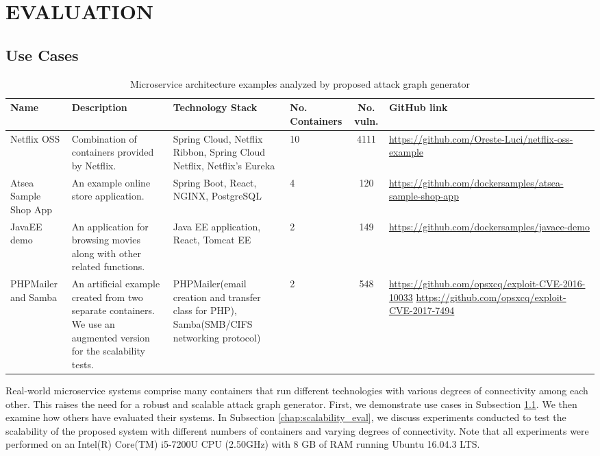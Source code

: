 
\section{EVALUATION}
\label{chap:eval}

\subsection{Use Cases}
\label{chap:heterogenious_systems}
\begin{table*}[!htb]
	\begin{center}
		\begin{tabular}{ p{20mm}p{35mm}p{35mm}p{10mm}cp{35mm} } 
			\hline
			Name & Description & Technology Stack & No. Containers & No. vuln. & GitHub link \\\hline 
			
			Netflix OSS & Combination of containers provided by Netflix. & Spring Cloud, Netflix Ribbon, Spring Cloud Netflix, Netflix's Eureka & 10 & 4111 & \url{https://github.com/Oreste-Luci/netflix-oss-example} \\
			
			Atsea Sample Shop App & An example online store application. & Spring Boot, React, NGINX, PostgreSQL & 4 & 120 & \url{https://github.com/dockersamples/atsea-sample-shop-app} \\
			
			JavaEE demo & An application for browsing movies along with other related functions. & Java EE application, React, Tomcat EE & 2 & 149 & \url{https://github.com/dockersamples/javaee-demo} \\
			
			PHPMailer and Samba & An artificial example created from two separate containers. We use an augmented version for the scalability tests. & PHPMailer(email creation and transfer class for PHP), Samba(SMB/CIFS networking protocol) & 2 & 548 &  \url{https://github.com/opsxcq/exploit-CVE-2016-10033}
			\url{https://github.com/opsxcq/exploit-CVE-2017-7494} \\
			
			
			\hline
		\end{tabular}
	\end{center}
	
	\caption{Microservice architecture examples analyzed by proposed attack graph generator}
	\label{table_technologies}
	
\end{table*}

Real-world microservice systems comprise many containers that run different technologies with various degrees of connectivity among each other. This raises the need for a robust and scalable attack graph generator. First, we demonstrate use cases in Subsection \ref{chap:heterogenious_systems}. We then examine how others have evaluated their systems. In Subsection \ref{chap:scalability_eval}, we discuss experiments conducted to test the scalability of the proposed system with different numbers of containers and varying degrees of connectivity. Note that all experiments were performed on an Intel(R) Core(TM) i5-7200U CPU (2.50GHz) with 8 GB of RAM running Ubuntu 16.04.3 LTS.

